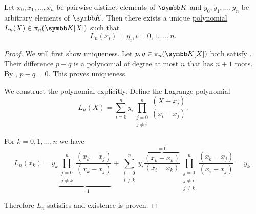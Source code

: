 \begin{theorem}\label{thm:lagrange_interpolation}
  Let \( x_0, x_1, \ldots, x_n \) be pairwise distinct elements of \( \BK \) and \( y_0, y_1, \ldots, y_n \) be arbitrary elements of \( \BK \). Then there exists a unique \hyperref[def:polynomial]{polynomial} \( L_n(X) \in \pi_n(\BK[X]) \) such that
  \begin{equation}\label{thm:lagrange_interpolation/condition}
    L_n(x_i) = y_i, i = 0, 1, \ldots, n.
  \end{equation}
\end{theorem}
\begin{proof}
  We will first show uniqueness. Let \( p, q \in \pi_n(\BK[X]) \) both satisfy . Their difference \( p - q \) is a polynomial of degree at most \( n \) that has \( n + 1 \) roots. By , \( p - q = 0 \). This proves uniqueness.

  We construct the polynomial explicitly. Define the Lagrange polynomial
  \begin{equation*}
    L_n(X) = \sum_{i=0}^n y_i \prod_{\substack{j = 0 \\ j \neq i}}^n \frac {(X - x_j)} {(x_i - x_j)}.
  \end{equation*}

  For \( k = 0, 1, \ldots, n \) we have
  \begin{equation*}
    L_n(x_k) = y_k \underbrace{\prod_{\substack{j = 0 \\ j \neq k}}^n \frac {(x_k - x_j)} {(x_k - x_j)}}_{=1} + \sum_{\substack{i = 0 \\ i \neq k}}^n y_i \overbrace{\frac{(x_k - x_k)}{(x_i - x_k)}}^{=0} \prod_{\substack{j = 0 \\ j \neq i \\ j \neq k}}^n \frac {(x_k - x_j)} {(x_i - x_j)} = y_k.
  \end{equation*}

  Therefore \( L_n \) satisfies  and existence is proven.
\end{proof}
